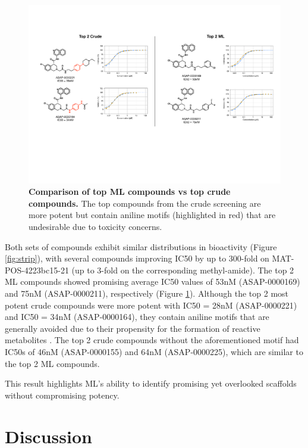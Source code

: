 \begin{figure}[!t]
 \centering
 \includegraphics[width=\textwidth]{Chapters/Crude/Figs/ml_vs_crude.pdf}
 \caption{\textbf{Comparison of top ML compounds vs top crude compounds.} The top compounds from the crude screening are more potent but contain aniline motifs (highlighted in red) that are undesirable due to toxicity concerns.}
 \label{fig:ml_vs_crude}
\end{figure}

Both sets of compounds exhibit similar distributions in bioactivity (Figure \ref{fig:strip}), with several compounds improving IC50 by up to 300-fold on MAT-POS-4223bc15-21 (up to 3-fold on the corresponding methyl-amide). The top 2 ML compounds showed promising average IC50 values of 53nM (ASAP-0000169) and 75nM (ASAP-0000211), respectively (Figure \ref{fig:ml_vs_crude}). Although the top 2 most potent crude compounds were more potent with IC50 = 28nM (ASAP-0000221) and IC50 = 34nM (ASAP-0000164), they contain aniline motifs that are generally avoided due to their propensity for the formation of reactive metabolites \cite{Stepan2011aniline}. The top 2 crude compounds without the aforementioned motif had IC50s of 46nM (ASAP-0000155) and 64nM (ASAP-0000225), which are similar to the top 2 ML compounds.

This result highlights ML's ability to identify promising yet overlooked scaffolds without compromising potency. 

\section{Discussion}

